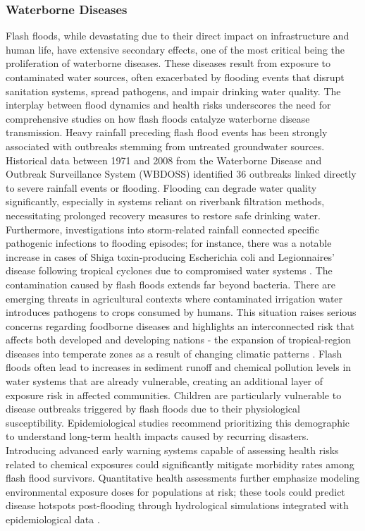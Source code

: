 \subsubsection{Waterborne Diseases}
Flash floods, while devastating due to their direct impact on infrastructure and human life, have extensive secondary effects, one of the most critical being the proliferation of waterborne diseases. These diseases result from exposure to contaminated water sources, often exacerbated by flooding events that disrupt sanitation systems, spread pathogens, and impair drinking water quality. The interplay between flood dynamics and health risks underscores the need for comprehensive studies on how flash floods catalyze waterborne disease transmission.
Heavy rainfall preceding flash flood events has been strongly associated with outbreaks stemming from untreated groundwater sources. Historical data between 1971 and 2008 from the Waterborne Disease and Outbreak Surveillance System (WBDOSS) identified 36 outbreaks linked directly to severe rainfall events or flooding. Flooding can degrade water quality significantly, especially in systems reliant on riverbank filtration methods, necessitating prolonged recovery measures to restore safe drinking water. Furthermore, investigations into storm-related rainfall connected specific pathogenic infections to flooding episodes; for instance, there was a notable increase in cases of Shiga toxin-producing Escherichia coli and Legionnaires' disease following tropical cyclones due to compromised water systems \citep{Abegaz2024}.
The contamination caused by flash floods extends far beyond bacteria. There are emerging threats in agricultural contexts where contaminated irrigation water introduces pathogens to crops consumed by humans. This situation raises serious concerns regarding foodborne diseases and highlights an interconnected risk that affects both developed and developing nations - the expansion of tropical-region diseases into temperate zones as a result of changing climatic patterns \citep{DuchenneMoutien2021}.
Flash floods often lead to increases in sediment runoff and chemical pollution levels in water systems that are already vulnerable, creating an additional layer of exposure risk in affected communities. Children are particularly vulnerable to disease outbreaks triggered by flash floods due to their physiological susceptibility. Epidemiological studies recommend prioritizing this demographic to understand long-term health impacts caused by recurring disasters. Introducing advanced early warning systems capable of assessing health risks related to chemical exposures could significantly mitigate morbidity rates among flash flood survivors. Quantitative health assessments further emphasize modeling environmental exposure doses for populations at risk; these tools could predict disease hotspots post-flooding through hydrological simulations integrated with epidemiological data \citep{AlRawas2024}.
